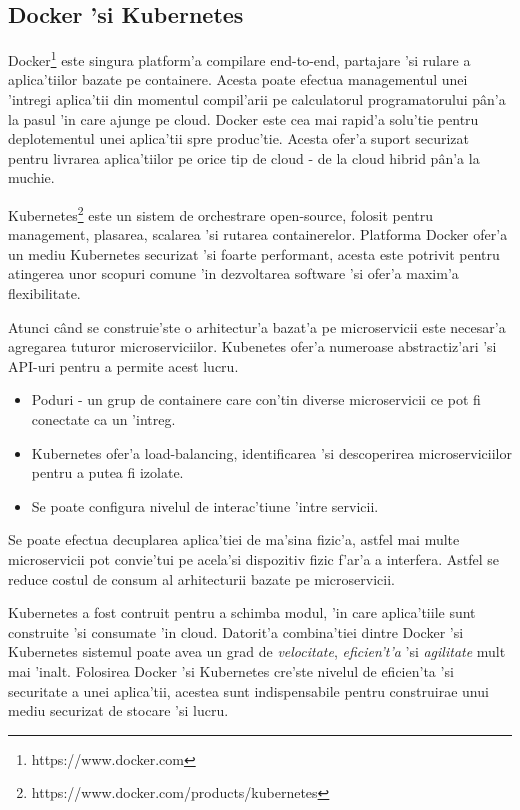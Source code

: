 \documentclass[12pt,a4paper,twoside]{report}
\begin{document}
\subsection{Docker 'si Kubernetes}
Docker\footnote{https://www.docker.com} este singura platform'a compilare end-to-end, partajare 'si rulare a aplica'tiilor bazate pe containere. Acesta poate efectua managementul unei 'intregi aplica'tii din momentul compil'arii pe calculatorul programatorului pân'a la pasul 'in care ajunge pe cloud. Docker este cea mai rapid'a solu'tie pentru deplotementul unei aplica'tii spre produc'tie. Acesta ofer'a suport securizat pentru livrarea aplica'tiilor pe orice tip de cloud - de la cloud hibrid pân'a la muchie.

Kubernetes\footnote{https://www.docker.com/products/kubernetes} este un sistem de orchestrare open-source, folosit pentru management, plasarea, scalarea 'si rutarea containerelor. Platforma Docker ofer'a un mediu Kubernetes securizat 'si foarte performant, acesta este potrivit pentru atingerea unor scopuri comune 'in dezvoltarea software 'si ofer'a maxim'a flexibilitate.

Atunci când se construie'ste o arhitectur'a bazat'a pe microservicii este necesar'a agregarea tuturor microserviciilor. Kubenetes ofer'a numeroase abstractiz'ari 'si API-uri pentru a permite acest lucru.
\begin{itemize}
\item Poduri - un grup de containere care con'tin diverse microservicii ce pot fi conectate ca un 'intreg.
\item Kubernetes ofer'a load-balancing, identificarea 'si descoperirea microserviciilor pentru a putea fi izolate.
\item Se poate configura nivelul de interac'tiune 'intre servicii.
\end{itemize}
Se poate efectua decuplarea aplica'tiei de ma'sina fizic'a, astfel mai multe microservicii pot convie'tui pe acela'si dispozitiv fizic f'ar'a a interfera. Astfel se reduce costul de consum al arhitecturii bazate pe microservicii.

Kubernetes a fost contruit pentru  a schimba modul, 'in care aplica'tiile sunt construite 'si consumate 'in cloud. Datorit'a combina'tiei dintre Docker 'si Kubernetes sistemul poate avea un grad de \textit{velocitate}, \textit{eficien't'a} 'si \textit{agilitate} mult mai 'inalt. Folosirea Docker 'si Kubernetes cre'ste nivelul de eficien'ta 'si securitate a unei aplica'tii, acestea sunt indispensabile pentru construirae unui mediu securizat de stocare 'si lucru.
\end{document}
